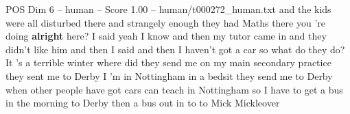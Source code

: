 \begin{textsample}{POS Dim 6 – human – Score 1.00 – human/t000272\_human.txt}  \label{ex:f6_pos_014}
and the kids were all disturbed there and strangely enough they had Maths there you 're doing \textbf{alright} here?
I said yeah I know and then my tutor came in and they didn't like him and then I said and then I haven't got a car so what do they do?
It 's a terrible winter where did they send me on my main secondary practice they sent me to Derby I 'm in Nottingham in a bedsit they send me to Derby when other people have got cars can teach in Nottingham so I have to get a bus in the morning to Derby then a bus out in to to Mick Mickleover

\end{textsample}
